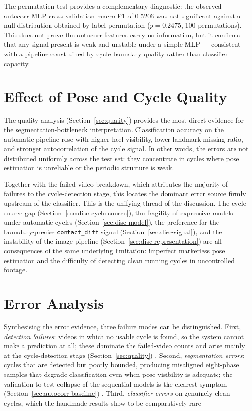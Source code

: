 The permutation test provides a complementary diagnostic: the observed autocorr
MLP cross-validation macro-F1 of 0.5206 was not significant against a null
distribution obtained by label permutation ($p = 0.2475$, 100 permutations).
This does not prove the autocorr features carry no information, but it confirms
that any signal present is weak and unstable under a simple MLP --- consistent
with a pipeline constrained by cycle boundary quality rather than classifier
capacity.

\section{Effect of Pose and Cycle Quality}
\label{sec:disc-quality}

The quality analysis (Section~\ref{sec:quality}) provides the most direct
evidence for the segmentation-bottleneck interpretation. Classification
accuracy on the automatic pipeline rose with higher heel visibility, lower
landmark missing-ratio, and stronger autocorrelation of the cycle signal. In
other words, the errors are not distributed uniformly across the test set; they
concentrate in cycles where pose estimation is unreliable or the periodic
structure is weak.

Together with the failed-video breakdown, which attributes
the majority of failures to the cycle-detection stage, this locates the
dominant error source firmly upstream of the classifier. This is the unifying thread of the discussion. The cycle-source gap
(Section~\ref{sec:disc-cycle-source}), the fragility of expressive models under
automatic cycles (Section~\ref{sec:disc-model}), the preference for the
boundary-precise \texttt{contact\_diff} signal
(Section~\ref{sec:disc-signal}), and the instability of the image pipeline
(Section~\ref{sec:disc-representation}) are all consequences of the same
underlying limitation: imperfect markerless pose estimation and the difficulty
of detecting clean running cycles in uncontrolled footage. 
\section{Error Analysis}
\label{sec:disc-error}

Synthesising the error evidence, three failure modes can be distinguished. First, \emph{detection failures}: videos in which no usable cycle is found, so
the system cannot make a prediction at all; these dominate the failed-video
counts and arise mainly at the cycle-detection stage
(Section~\ref{sec:quality}) . Second, \emph{segmentation errors}: cycles that are
detected but poorly bounded, producing misaligned eight-phase samples that
degrade classification even when pose visibility is adequate; the
validation-to-test collapse of the sequential models is the clearest symptom
(Section~\ref{sec:autocorr-baseline}) . Third, \emph{classifier errors} on
genuinely clean cycles, which the handmade results show to be comparatively
rare.

